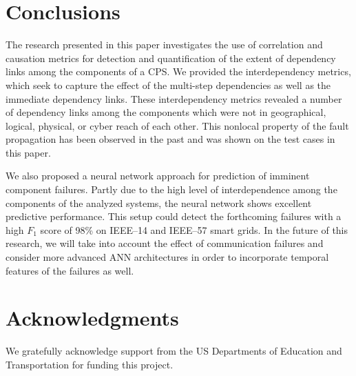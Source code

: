 \documentclass[12pt]{elsarticle}
\newif\ifappendix
\begin{document}
\section{Conclusions}
\label{sec:conc}
The research presented in this paper investigates the use of correlation and causation metrics for detection and quantification of the extent of dependency links among the components of a CPS. We provided the interdependency metrics, which seek to capture the effect of the multi-step dependencies as well as the immediate dependency links. These interdependency metrics revealed a number of dependency links among the components which were not in geographical, logical, physical, or cyber reach of each other. This nonlocal property of the fault propagation has been observed in the past and was shown on the test cases in this paper.

We also proposed a neural network approach for prediction of imminent component failures. Partly due to the high level of interdependence among the components of the analyzed systems, the neural network shows excellent predictive performance. This setup could detect the forthcoming failures with a high $F_1$ score of 98\% on IEEE--14 and IEEE--57 smart grids. In the future of this research, we will take into account the effect of communication failures and consider more advanced ANN architectures in order to incorporate temporal features of the failures as well.%

\section*{Acknowledgments}
We gratefully acknowledge support from the US Departments of Education and Transportation for funding this project.



\ifappendix
  \newpage
  \appendix
  \section{Largest Dependency Links ($d_{ij}$)}
  
  \section{Largest Multi-step Dependency Links ($t_{ij}$)}
  
  \section{Largest Out-degree Values ($\tau_i$)}
  
  \section{Largest In-degree Values ($\nu_j$)}
  
\fi
\end{document}
